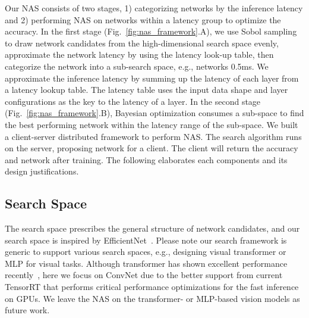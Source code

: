 \documentclass[10pt,twocolumn,letterpaper]{article}
\begin{document}
Our NAS consists of two stages, 1) categorizing networks by the inference latency and 2) performing NAS on networks within a latency group to optimize the accuracy. In the first stage (Fig.~\ref{fig:nas_framework}.A), we use Sobol sampling~\cite{sobol1967distribution} to draw network candidates from the high-dimensional search space evenly, approximate the network latency by using the latency look-up table, then categorize the network into a sub-search space, e.g., networks  0.5ms. We approximate the inference latency by summing up the latency of each layer from a latency lookup table. The latency table uses the input data shape and layer configurations as the key to the latency of a layer. In the second stage (Fig.~\ref{fig:nas_framework}.B), Bayesian optimization consumes a sub-space to find the best performing network within the latency range of the sub-space. We built a client-server distributed framework to perform NAS. The search algorithm runs on the server, proposing network for a client. The client will return the accuracy and network after training. The following elaborates each components and its design justifications.

\subsection{Search Space}
\label{sec:search_space}

The search space prescribes the general structure of network candidates, and our search space is inspired by EfficientNet~\cite{tan2021efficientnetv2}. Please note our search framework is generic to support various search spaces, e.g., designing visual transformer or MLP for visual tasks. Although transformer has shown excellent performance recently~\cite{liu2021swin, bao2021beit}, here we focus on ConvNet due to the better support from current TensorRT that performs critical performance optimizations for the fast inference on GPUs. We leave the NAS on the transformer- or MLP-based vision models as future work.
\end{document}
